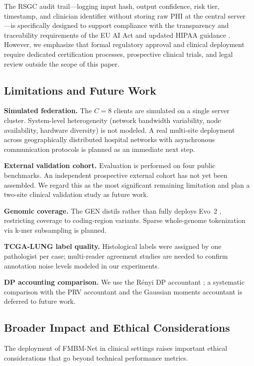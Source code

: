 \documentclass[a4paper,fleqn]{cas-dc}
\begin{document}
The RSGC audit trail---logging input hash, output confidence, risk tier,
timestamp, and clinician identifier without storing raw PHI at the central
server---is specifically designed to support compliance with the transparency
and traceability requirements of the EU AI Act \citep{eu_ai_act_2024} and
updated HIPAA guidance \citep{hipaa_guidance_2024}. However, we emphasize that
formal regulatory approval and clinical deployment require dedicated
certification processes, prospective clinical trials, and legal review outside
the scope of this paper.

\subsection{Limitations and Future Work}

\textbf{Simulated federation.} The $C\!=\!8$ clients are simulated on a single
server cluster. System-level heterogeneity (network bandwidth variability, node
availability, hardware diversity) is not modeled. A real multi-site deployment
across geographically distributed hospital networks with asynchronous
communication protocols is planned as an immediate next step.

\textbf{External validation cohort.} Evaluation is performed on four public
benchmarks. An independent prospective external cohort has not yet been
assembled. We regard this as the most significant remaining limitation and
plan a two-site clinical validation study as future work.

\textbf{Genomic coverage.} The GEN distils rather than fully deploys
Evo~2 \citep{evo2_2026}, restricting coverage to coding-region variants.
Sparse whole-genome tokenization via k-mer subsampling is planned.

\textbf{TCGA-LUNG label quality.} Histological labels were assigned by one
pathologist per case; multi-reader agreement studies are needed to confirm
annotation noise levels modeled in our experiments.

\textbf{DP accounting comparison.} We use the R\'{e}nyi DP
accountant \citep{mironov2017renyi}; a systematic comparison with the PRV
accountant \citep{gopi2021prv} and the Gaussian moments accountant is deferred
to future work.

\subsection{Broader Impact and Ethical Considerations}

The deployment of FMBM-Net in clinical settings raises important ethical
considerations that go beyond technical performance metrics.
\end{document}
